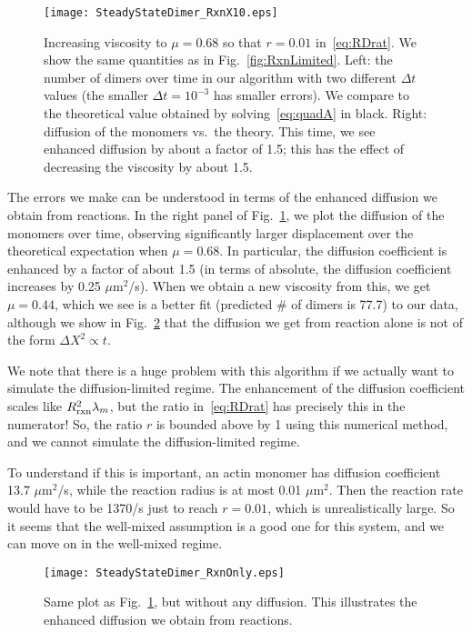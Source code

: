\documentclass[11pt]{article}
\begin{document}
\begin{figure}
\centering
\texttt{[image: SteadyStateDimer\_RxnX10.eps]}
\caption{\label{fig:TenMoreDiff}Increasing viscosity to $\mu=0.68$ so that $r=0.01$ in\ \eqref{eq:RDrat}. We show the same quantities as in Fig.\ \ref{fig:RxnLimited}. Left: the number of dimers over time in our algorithm with two different $\Delta t$ values (the smaller $\Delta t = 10^{-3}$ has smaller errors). We compare to the theoretical value obtained by solving\ \eqref{eq:quadA} in black. Right: diffusion of the monomers vs.\ the theory. This time, we see enhanced diffusion by about a factor of 1.5; this has the effect of decreasing the viscosity by about 1.5. }
\end{figure}

The errors we make can be understood in terms of the enhanced diffusion we obtain from reactions. In the right panel of Fig.\ \ref{fig:TenMoreDiff}, we plot the diffusion of the monomers over time, observing significantly larger displacement over the theoretical expectation when $\mu=0.68$. In particular, the diffusion coefficient is enhanced by a factor of about 1.5 (in terms of absolute, the diffusion coefficient increases by 0.25 $\mu$m$^2$/s). When we obtain a new viscosity from this, we get $\mu=0.44$, which we see is a better fit (predicted \# of dimers is 77.7) to our data, although we show in Fig.\ \ref{fig:RxnOnly}  that the diffusion we get from reaction alone is not of the form $\Delta X^2 \propto t$. 

We note that there is a huge problem with this algorithm if we actually want to simulate the diffusion-limited regime. The enhancement of the diffusion coefficient scales like $R_\text{rxn}^2 \lambda_m$, but the ratio in\ \eqref{eq:RDrat} has precisely this in the numerator! So, the ratio $r$ is bounded above by 1 using this numerical method, and we cannot simulate the diffusion-limited regime. 

To understand if this is important, an actin monomer has diffusion coefficient 13.7 $\mu$m$^2$/s, while the reaction radius is at most 0.01 $\mu$m$^2$. Then the reaction rate would have to be 1370/s just to reach $r=0.01$, which is unrealistically large. So it seems that the well-mixed assumption is a good one for this system, and we can move on in the well-mixed regime.

\begin{figure}
\centering
\texttt{[image: SteadyStateDimer\_RxnOnly.eps]}
\caption{\label{fig:RxnOnly}Same plot as Fig.\ \ref{fig:TenMoreDiff}, but without any diffusion. This illustrates the enhanced diffusion we obtain from reactions.}
\end{figure}
\end{document}

